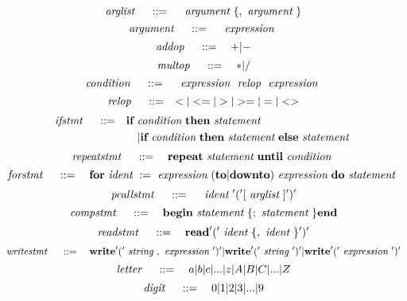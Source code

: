 \[
	~\emph{arglist}~ \quad ::= \quad
		~\emph{argument}~ \{, ~\emph{argument}~ \}
\]
\[
	~\emph{argument}~ \quad ::= \quad
		~\emph{expression}~
\]
\[
	~\emph{addop}~ \quad ::= \quad
		+|-
\]
\[
	~\emph{multop}~ \quad ::= \quad
		*|/
\]
\[
	~\emph{condition}~ \quad ::= \quad
		~\emph{expression}~ ~\emph{relop}~ ~\emph{expression}~
\]
\[
	~\emph{relop}~ \quad ::= \quad
		< | <= | > | >=| = |  <>
\]
\[
\begin{aligned}
	~\emph{ifstmt}~ \quad ::= \quad
		& \textbf{if} ~\emph{condition}~ \textbf{then} ~\emph{statement}~ \\
		& \quad | \textbf{if} ~\emph{condition}~ \textbf{then} ~\emph{statement}~ \textbf{else} ~\emph{statement}~
\end{aligned}
\]
\[
	~\emph{repeatstmt}~ \quad ::= \quad
		\textbf{repeat} ~\emph{statement}~ \textbf{until} ~\emph{condition}~
\]
\[
	~\emph{forstmt}~ \quad ::= \quad
		\textbf{for} ~\emph{ident}~ := ~\emph{expression}~ ( \textbf{to} | \textbf{downto})
			~\emph{expression}~ \textbf{do} ~\emph{statement}~
\]
\[
	~\emph{pcallstmt}~ \quad ::= \quad
		~\emph{ident}~ '(' [ ~\emph{arglist}~] ')'
\]
\[
	~\emph{compstmt}~ \quad ::= \quad
		\textbf{begin} ~\emph{statement}~ \{; ~\emph{statement}~ \} \textbf{end}
\]
\[
	~\emph{readstmt}~ \quad ::= \quad
		\textbf{read} '(' ~\emph{ident}~ \{, ~\emph{ident}~ \} ')'
\]
\[
	~\emph{writestmt}~ \quad ::= \quad
		\textbf{write} '(' ~\emph{string}~ , ~\emph{expression}~ ')' |
			\textbf{write} '(' ~\emph{string}~ ')' |
				\textbf{write} '(' ~\emph{expression}~')'
\]
\[
	~\emph{letter}~ \quad ::= \quad
		a|b|c|...|z|A|B|C|...|Z
\]
\[
	~\emph{digit}~ \quad ::= \quad
		0|1|2|3|...|9
\]
